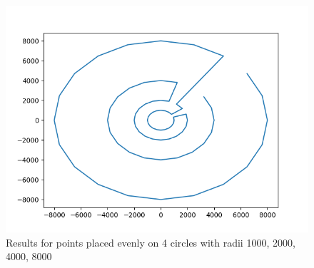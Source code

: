 \documentclass[12pt]{article}
\begin{document}
\begin{figure}
\includegraphics[scale=0.5]{20CirclesMyHeuristic.png}
\caption{Results for points placed evenly on 4 circles with radii 1000, 2000, 4000, 8000}
\end{figure}
\end{document}
